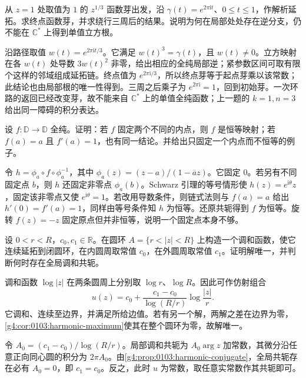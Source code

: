 \begin{exercise}
	\label{g4:ex:0101:cubic-monodromy}
	从 \(z=1\) 处取值为 \(1\) 的 \(z^{1/3}\) 函数芽出发，沿 \(\gamma(t)=e^{2\pi\mathrm i t}\)、\(0\le t\le1\)，作解析延拓。求终点函数芽，并求绕行三周后的结果。说明为何在局部处处存在逆分支，仍不能在 \(\mathbb C^*\) 上得到单值立方根。
\end{exercise}
\begin{solution}
	沿路径取值 \(w(t)=e^{2\pi\mathrm i t/3}\)。它满足 \(w(t)^3=\gamma(t)\)，且 \(w(t)\ne0\)。立方映射在各 \(w(t)\) 处导数 \(3w(t)^2\) 非零，给出相应的全纯局部逆；紧参数区间可取有限个这样的邻域组成延拓链。终点值为 \(e^{2\pi\mathrm i/3}\)，所以终点芽等于起点芽乘以该常数；此结论也由局部根的唯一性得到。三周之后乘子为 \(e^{2\pi\mathrm i}=1\)，回到初始芽。一次环路的返回已经改变芽，故不能来自 \(\mathbb C^*\) 上的单值全纯函数；上一题的 \(k=1,n=3\) 给出同一障碍的积分表达。
\end{solution}

\begin{exercise}
	\label{g4:ex:0101:two-fixed-points}
	设 \(f:\mathbb D\to\mathbb D\) 全纯。证明：若 \(f\) 固定两个不同的内点，则 \(f\) 是恒等映射；若 \(f(a)=a\) 且 \(f'(a)=1\)，也有同一结论。并给出只固定一个内点而不恒等的例子。
\end{exercise}
\begin{solution}
	令 \(h=\phi_a\circ f\circ\phi_a^{-1}\)，其中 \(\phi_a(z)=(z-a)/(1-\overline a z)\)。它固定 \(0\)。若另有不同固定点 \(b\)，则 \(h\) 还固定非零点 \(\phi_a(b)\)。Schwarz 引理的等号情形使 \(h(z)=e^{\mathrm i\theta}z\)，固定该非零点又使 \(e^{\mathrm i\theta}=1\)。若改用导数条件，则链式法则与 \(f(a)=a\) 给出 \(h'(0)=f'(a)=1\)，同样由等号条件知 \(h\) 为恒等。还原共轭得到 \(f\) 为恒等。旋转 \(f(z)=-z\) 固定原点但并非恒等，说明一个固定点本身不够。
\end{solution}

\begin{exercise}
	\label{g4:ex:0101:harmonic-oscillation}
	设 \(0<r<R\)，\(c_0,c_1\in\mathbb R\)。在圆环 \(A=\{r<|z|<R\}\) 上构造一个调和函数，使它连续延拓到闭圆环，在内圆周取常值 \(c_0\)，在外圆周取常值 \(c_1\)。证明解唯一，并判断何时存在全局调和共轭。
\end{exercise}
\begin{solution}
	调和函数 \(\log|z|\) 在两条圆周上分别取 \(\log r\)、\(\log R\)。因此可作仿射组合
	\[
		u(z)=c_0+\frac{c_1-c_0}{\log(R/r)}\log\frac{|z|}{r}.
	\]
	它调和、连续至边界，并满足所给边值。若有另一个解，两解之差在边界为零，\cref{g4:cor:0103:harmonic-maximum}使其在整个圆环为零，故解唯一。

	令 \(A_0=(c_1-c_0)/\log(R/r)\)。局部调和共轭为 \(A_0\arg z\) 加常数，其微分沿任意正向同心圆的积分为 \(2\pi A_0\)。由\cref{g4:prop:0103:harmonic-conjugate}，全局共轭存在必有 \(A_0=0\)，即 \(c_1=c_0\)。反之，此时 \(u\) 为常数，取任意实常数作其共轭即可。
\end{solution}

